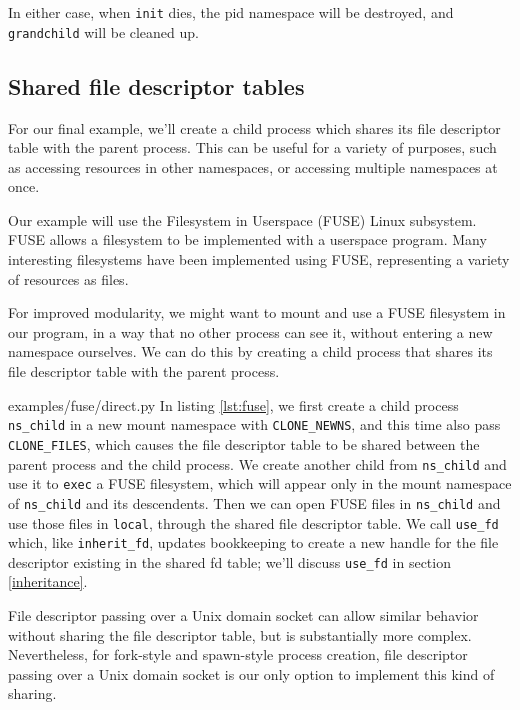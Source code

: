 \documentclass[letterpaper,twocolumn,10pt]{article}
\begin{document}
In either case, when \texttt{init} dies,
the pid namespace will be destroyed,
and \texttt{grandchild} will be cleaned up.
\subsection{Shared file descriptor tables}\label{shared_fd_table}
For our final example,
we'll create a child process which shares its file descriptor table with the parent process.
This can be useful for a variety of purposes,
such as accessing resources in other namespaces, or accessing multiple namespaces at once.

Our example will use the Filesystem in Userspace (FUSE) Linux subsystem.
FUSE\cite{fuse} allows a filesystem to be implemented with a userspace program.
Many interesting filesystems\cite{sshfs}\cite{encfs}\cite{mp3fs} have been implemented using FUSE,
representing a variety of resources as files.

For improved modularity, we might want to mount and use a FUSE filesystem in our program,
in a way that no other process can see it,
without entering a new namespace ourselves.
We can do this by creating a child process that shares its file descriptor table with the parent process.


{examples/fuse/direct.py}
In listing \ref{lst:fuse},
we first create a child process \verb|ns_child| in a new mount namespace with \verb|CLONE_NEWNS|,
and this time also pass \verb|CLONE_FILES|,
which causes the file descriptor table to be shared between the parent process and the child process\cite{clone}.
We create another child from \verb|ns_child|
and use it to \texttt{exec} a FUSE filesystem,
which will appear only in the mount namespace of \verb|ns_child| and its descendents.
Then we can open FUSE files in \verb|ns_child|
and use those files in \texttt{local},
through the shared file descriptor table.
We call \texttt{use\_fd} which, like \texttt{inherit\_fd},
updates bookkeeping to create a new handle for the file descriptor existing in the shared fd table;
we'll discuss \texttt{use\_fd} in section \ref{inheritance}.

File descriptor passing over a Unix domain socket
can allow similar behavior without sharing the file descriptor table,
but is substantially more complex\cite{scm_rights}.
Nevertheless, for fork-style and spawn-style process creation,
file descriptor passing over a Unix domain socket
is our only option to implement this kind of sharing.
\end{document}
